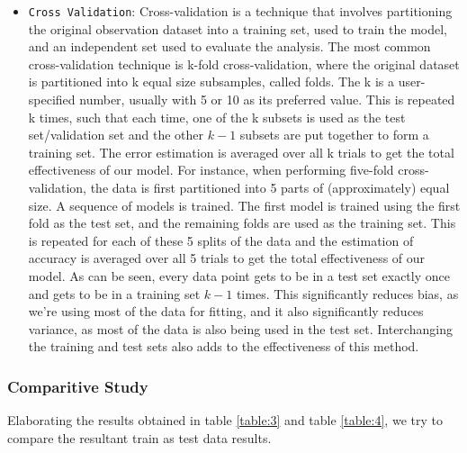 \documentclass[12pt]{article}
\begin{document}
\begin{itemize}
\item
\texttt{Cross Validation}: Cross-validation is a technique that involves partitioning the original observation dataset into a training set, used to train the model, and an independent set used to evaluate the analysis. The most common cross-validation technique is k-fold cross-validation, where the original dataset is partitioned into k equal size subsamples, called folds. The k is a user-specified number, usually with 5 or 10 as its preferred value. This is repeated k times, such that each time, one of the k subsets is used as the test set/validation set and the other $k-1$ subsets are put together to form a training set. The error estimation is averaged over all k trials to get the total effectiveness of our model. For instance, when performing five-fold cross-validation, the data is first partitioned into 5 parts of (approximately) equal size. A sequence of models is trained. The first model is trained using the first fold as the test set, and the remaining folds are used as the training set. This is repeated for each of these 5 splits of the data and the estimation of accuracy is averaged over all 5 trials to get the total effectiveness of our model. As can be seen, every data point gets to be in a test set exactly once and gets to be in a training set $k-1$ times. This significantly reduces bias, as we’re using most of the data for fitting, and it also significantly reduces variance, as most of the data is also being used in the test set. Interchanging the training and test sets also adds to the effectiveness of this method.

\end{itemize}
\subsubsection{Comparitive Study}
Elaborating the results obtained in table \ref{table:3} and table \ref{table:4}, we try to compare the resultant train as test data results.
\end{document}

